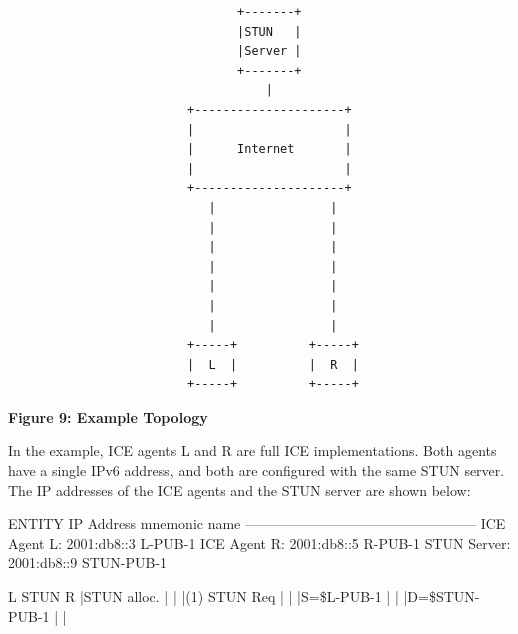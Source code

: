 \documentclass{article}
\begin{document}
\begin{verbatim}
                                +-------+
                                |STUN   |
                                |Server |
                                +-------+
                                    |
                         +---------------------+
                         |                     |
                         |      Internet       |
                         |                     |
                         +---------------------+
                            |                |
                            |                |
                            |                |
                            |                |
                            |                |
                            |                |
                            |                |
                         +-----+          +-----+
                         |  L  |          |  R  |
                         +-----+          +-----+
\end{verbatim}

\begin{center}
\textbf{Figure 9: Example Topology}
\end{center}

In the example, ICE agents L and R are full ICE implementations. Both agents have a single IPv6 address, and both are configured with the same STUN server.  The IP addresses of the ICE agents and the STUN server are shown below:

ENTITY                   IP Address  mnemonic name -------------------------------------------------- ICE Agent L:             2001:db8::3   L-PUB-1 ICE Agent R:             2001:db8::5   R-PUB-1 STUN Server:             2001:db8::9   STUN-PUB-1

L                           STUN             R |STUN alloc.                  |              | |(1) STUN Req                 |              | |S=\$L-PUB-1                   |              | |D=\$STUN-PUB-1                |              |
\end{document}

